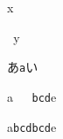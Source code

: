 \documentclass{jarticle}
\begin{document}
\parindent0pt\xkanjiskip=10pt %

x

\verb| |y %

あ\verb|a|い %

a\verb|   bcd|e %

a\verb|bcdbcd|e
\end{document}
